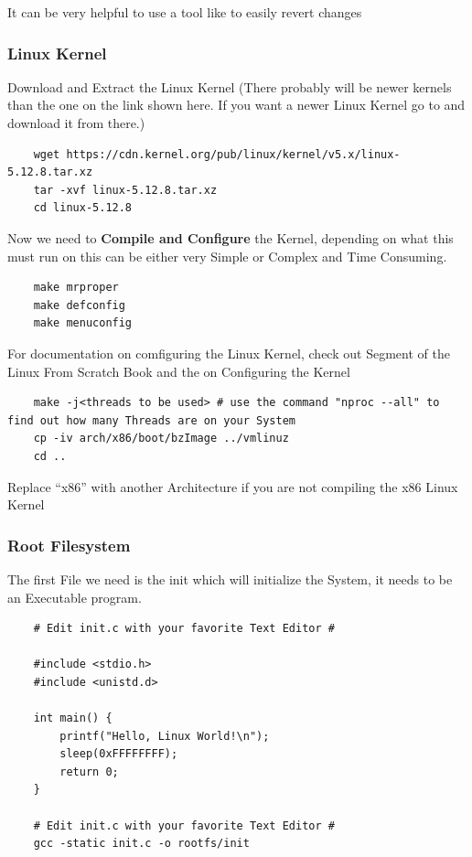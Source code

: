 \documentclass{article}
\begin{document}
			It can be very helpful to use a tool like  to easily revert changes
		\subsubsection{Linux Kernel}

			Download and Extract the Linux Kernel (There probably will be newer kernels than the one on the link shown here. If you want a newer Linux Kernel go to  and download it from there.)
			\begin{lstlisting}
	wget https://cdn.kernel.org/pub/linux/kernel/v5.x/linux-5.12.8.tar.xz
	tar -xvf linux-5.12.8.tar.xz
	cd linux-5.12.8
			\end{lstlisting}
			Now we need to \textbf{Compile and Configure} the Kernel, depending on what this must run on this can be either very Simple or Complex and Time Consuming.
			\begin{lstlisting}
	make mrproper
	make defconfig
	make menuconfig
			\end{lstlisting}
			For documentation on comfiguring the Linux Kernel, check out  Segment of the Linux From Scratch Book and the  on Configuring the Kernel
			\begin{lstlisting}
	make -j<threads to be used> # use the command "nproc --all" to find out how many Threads are on your System
	cp -iv arch/x86/boot/bzImage ../vmlinuz
	cd ..
			\end{lstlisting}
			Replace ``x86'' with another Architecture if you are not compiling the x86 Linux Kernel
		\subsubsection{Root Filesystem}
			The first File we need is the init which will initialize the System, it needs to be an Executable program.
			\begin{lstlisting}
	# Edit init.c with your favorite Text Editor #
	
	#include <stdio.h>
	#include <unistd.d>

	int main() {
		printf("Hello, Linux World!\n");
		sleep(0xFFFFFFFF);
		return 0;
	}

	# Edit init.c with your favorite Text Editor #
	gcc -static init.c -o rootfs/init
			\end{lstlisting}
\end{document}
